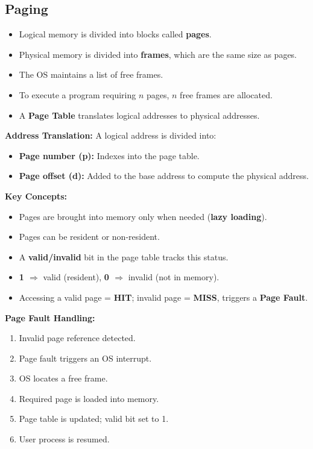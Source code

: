 \documentclass[a4paper, 10pt]{article}
\begin{document}
\subsection{Paging}
\begin{itemize}
    \item Logical memory is divided into blocks called \textbf{pages}.
    \item Physical memory is divided into \textbf{frames}, which are the same size as pages.
    \item The OS maintains a list of free frames.
    \item To execute a program requiring $n$ pages, $n$ free frames are allocated.
    \item A \textbf{Page Table} translates logical addresses to physical addresses.
\end{itemize}

\textbf{Address Translation:} A logical address is divided into:
\begin{itemize}
    \item \textbf{Page number (p):} Indexes into the page table.
    \item \textbf{Page offset (d):} Added to the base address to compute the physical address.
\end{itemize}

\textbf{Key Concepts:}
\begin{itemize}
    \item Pages are brought into memory only when needed (\textbf{lazy loading}).
    \item Pages can be resident or non-resident.
    \item A \textbf{valid/invalid} bit in the page table tracks this status.
    \item \textbf{1 $\Rightarrow$} valid (resident), \textbf{0 $\Rightarrow$} invalid (not in memory).
    \item Accessing a valid page = \textbf{HIT}; invalid page = \textbf{MISS}, triggers a \textbf{Page Fault}.
\end{itemize}

\textbf{Page Fault Handling:}
\begin{enumerate}
    \item Invalid page reference detected.
    \item Page fault triggers an OS interrupt.
    \item OS locates a free frame.
    \item Required page is loaded into memory.
    \item Page table is updated; valid bit set to 1.
    \item User process is resumed.
\end{enumerate}
\end{document}
